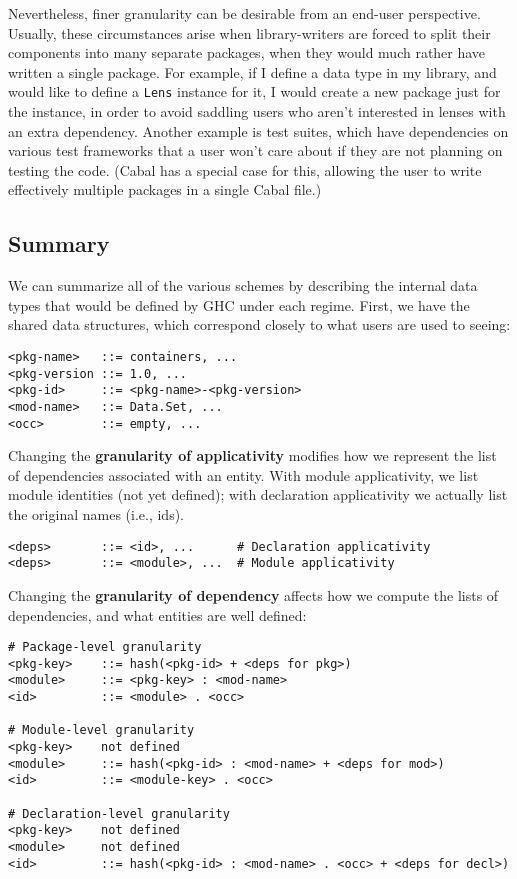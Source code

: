 \documentclass{article}
\begin{document}
Nevertheless, finer granularity can be desirable from an end-user perspective.
Usually, these circumstances arise when library-writers are forced to split their
components into many separate packages, when they would much rather have written
a single package.  For example, if I define a data type in my library, and would
like to define a \verb|Lens| instance for it, I would create a new package just
for the instance, in order to avoid saddling users who aren't interested in lenses
with an extra dependency.  Another example is test suites, which have dependencies
on various test frameworks that a user won't care about if they are not planning
on testing the code. (Cabal has a special case for this, allowing the user
to write effectively multiple packages in a single Cabal file.)

\subsection{Summary}

We can summarize all of the various schemes by describing the internal data
types that would be defined by GHC under each regime.  First, we have
the shared data structures, which correspond closely to what users are
used to seeing:

\begin{verbatim}
<pkg-name>   ::= containers, ...
<pkg-version ::= 1.0, ...
<pkg-id>     ::= <pkg-name>-<pkg-version>
<mod-name>   ::= Data.Set, ...
<occ>        ::= empty, ...
\end{verbatim}

Changing the \textbf{granularity of applicativity} modifies how we represent the
list of dependencies associated with an entity.  With module applicativity,
we list module identities (not yet defined); with declaration applicativity
we actually list the original names (i.e., ids).

\begin{verbatim}
<deps>       ::= <id>, ...      # Declaration applicativity
<deps>       ::= <module>, ...  # Module applicativity
\end{verbatim}

Changing the \textbf{granularity of dependency} affects how we compute
the lists of dependencies, and what entities are well defined:

\begin{verbatim}
# Package-level granularity
<pkg-key>    ::= hash(<pkg-id> + <deps for pkg>)
<module>     ::= <pkg-key> : <mod-name>
<id>         ::= <module> . <occ>

# Module-level granularity
<pkg-key>    not defined
<module>     ::= hash(<pkg-id> : <mod-name> + <deps for mod>)
<id>         ::= <module-key> . <occ>

# Declaration-level granularity
<pkg-key>    not defined
<module>     not defined
<id>         ::= hash(<pkg-id> : <mod-name> . <occ> + <deps for decl>)
\end{verbatim}
\end{document}
